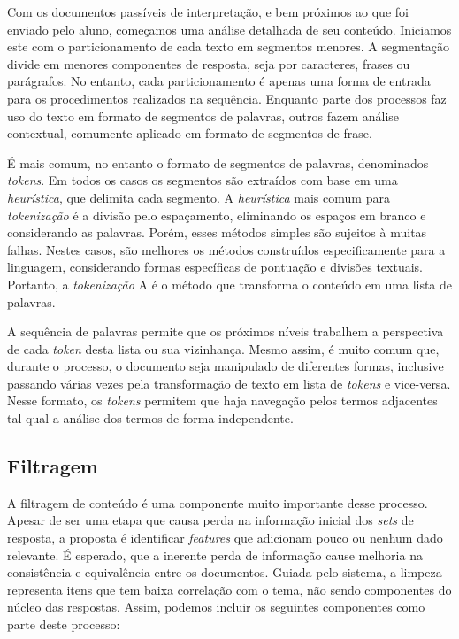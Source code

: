 
Com os documentos passíveis de interpretação, e bem próximos ao que foi enviado pelo aluno, começamos uma análise detalhada de seu conteúdo. Iniciamos este com o particionamento de cada texto em segmentos menores. A segmentação divide em menores componentes de resposta, seja por caracteres, frases ou parágrafos. No entanto, cada particionamento é apenas uma forma de entrada para os procedimentos realizados na sequência. Enquanto parte dos processos faz uso do texto em formato de segmentos de palavras, outros fazem análise contextual, comumente aplicado em formato de segmentos de frase.

É mais comum, no entanto o formato de segmentos de palavras, denominados \textit{tokens}. Em todos os casos os segmentos são extraídos com base em uma \textit{heurística}, que delimita cada segmento. A \textit{heurística} mais comum para \textit{tokenização} é a divisão pelo espaçamento, eliminando os espaços em branco e considerando as palavras. Porém, esses métodos simples são sujeitos à muitas falhas. Nestes casos, são melhores os métodos construídos especificamente para a linguagem, considerando formas específicas de pontuação e divisões textuais. Portanto, a \textit{tokenização} A é o método que transforma o conteúdo em uma lista de palavras.

A sequência de palavras permite que os próximos níveis trabalhem a perspectiva de cada \textit{token} desta lista ou sua vizinhança. Mesmo assim, é muito comum que, durante o processo, o documento seja manipulado de diferentes formas, inclusive passando várias vezes pela transformação de texto em lista de \textit{tokens} e vice-versa. Nesse formato, os \textit{tokens} permitem que haja navegação pelos termos adjacentes tal qual a análise dos termos de forma independente.


\subsection{Filtragem}
\label{subsec-filtragem}


A filtragem de conteúdo é uma componente muito importante desse processo. Apesar de ser uma etapa que causa perda na informação inicial dos \textit{sets} de resposta, a proposta é identificar \textit{features} que adicionam pouco ou nenhum dado relevante. É esperado, que a inerente perda de informação cause melhoria na consistência e equivalência entre os documentos. Guiada pelo sistema, a limpeza representa itens que tem baixa correlação com o tema, não sendo componentes do núcleo das respostas. Assim, podemos incluir os seguintes componentes como parte deste processo:

